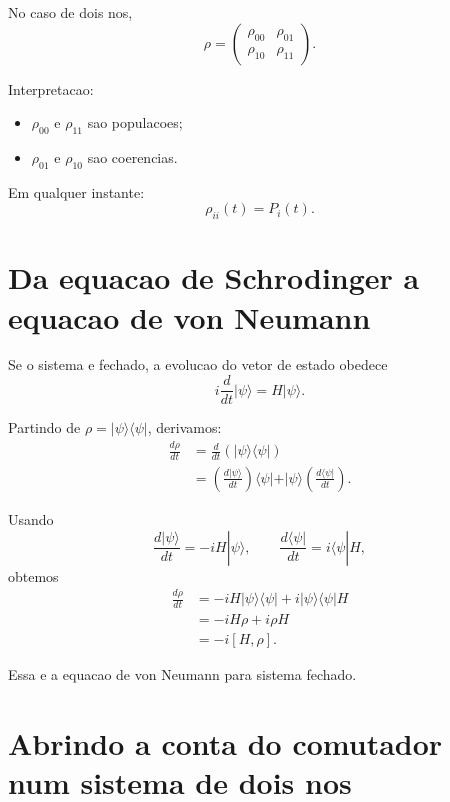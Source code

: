 \documentclass[11pt,a4paper]{article}
\begin{document}
No caso de dois nos,
\begin{equation}
\rho =
\begin{pmatrix}
\rho_{00} & \rho_{01} \\
\rho_{10} & \rho_{11}
\end{pmatrix}.
\end{equation}

Interpretacao:
\begin{itemize}
  \item $\rho_{00}$ e $\rho_{11}$ sao populacoes;
  \item $\rho_{01}$ e $\rho_{10}$ sao coerencias.
\end{itemize}

Em qualquer instante:
\begin{equation}
\rho_{ii}(t) = P_i(t).
\end{equation}

\section{Da equacao de Schrodinger a equacao de von Neumann}

Se o sistema e fechado, a evolucao do vetor de estado obedece
\begin{equation}
i\frac{d}{dt}|\psi\rangle = H|\psi\rangle.
\end{equation}

Partindo de $\rho = |\psi\rangle\langle\psi|$, derivamos:
\begin{align}
\frac{d\rho}{dt}
&= \frac{d}{dt}\left(|\psi\rangle\langle\psi|\right) \\
&= \left(\frac{d|\psi\rangle}{dt}\right)\langle\psi|
+ |\psi\rangle\left(\frac{d\langle\psi|}{dt}\right).
\end{align}

Usando
\begin{equation}
\frac{d|\psi\rangle}{dt} = -iH|\psi\rangle,
\qquad
\frac{d\langle\psi|}{dt} = i\langle\psi|H,
\end{equation}
obtemos
\begin{align}
\frac{d\rho}{dt}
&= -iH|\psi\rangle\langle\psi| + i|\psi\rangle\langle\psi|H \\
&= -iH\rho + i\rho H \\
&= -i[H,\rho].
\end{align}

Essa e a equacao de von Neumann para sistema fechado.

\section{Abrindo a conta do comutador num sistema de dois nos}
\end{document}

